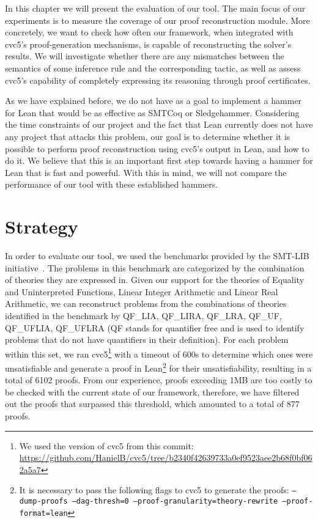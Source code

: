 In this chapter we will present the evaluation of our tool.
%
The main focus of our experiments is to measure the coverage
of our proof reconstruction module.
%
More concretely, we want to check how often our framework, when
integrated with cvc5's proof-generation mechanisms, is capable
of reconstructing the solver's results.
%
We will investigate whether there are any mismatches between
the semantics of some inference rule and the corresponding tactic,
as well as assess cvc5's capability of completely expressing
its reasoning through proof certificates.

As we have explained before, we do not have as a goal to implement a hammer
for Lean that would be as effective as SMTCoq or Sledgehammer.
%
Considering the time constraints of our project and the fact that
Lean currently does not have any project that attacks this problem, our goal
is to determine whether it is possible to perform proof reconstruction
using cvc5's output in Lean, and how to do it.
%
We believe that this is an important first step towards having
a hammer for Lean that is fast and powerful.
%
With this in mind, we will not compare the performance of our tool
with these established hammers.

\section{Strategy}

In order to evaluate our tool, we used the benchmarks provided
by the SMT-LIB initiative~\cite{smtlib_initiative}. The problems in this benchmark
are categorized by the combination of theories they are expressed in.
Given our support for the theories of Equality and Uninterpreted Functions,
Linear Integer Arithmetic and Linear Real Arithmetic, we can reconstruct problems
from the combinations of theories identified in the benchmark by QF\_LIA, QF\_LIRA,
QF\_LRA, QF\_UF, QF\_UFLIA, QF\_UFLRA (QF stands for quantifier free and is used
to identify problems that do not have quantifiers in their definition).
%
For each problem within this set, we ran cvc5\footnote{We used the version of
  cvc5 from this commit: \url{https://github.com/HanielB/cvc5/tree/b2340f42639733a0ef9523aee2b68f0bf062a5a7}}
with a timeout of 600s to determine
which ones were unsatisfiable and generate a proof in Lean\footnote{It is necessary to pass the following
  flags to cvc5 to generate the proofs: \texttt{--dump-proofs --dag-thresh=0
    --proof-granularity=theory-rewrite --proof-format=lean}} for their unsatisfiability,
resulting in a total of 6102 proofs.
%
From our experience, proofs exceeding 1MB are too costly to be checked
with the current state of our framework, therefore, we have filtered out the proofs
that surpassed this threshold, which amounted to a total of 877 proofs.

